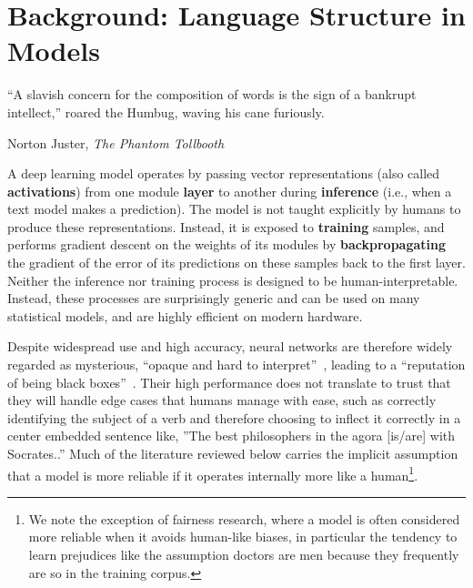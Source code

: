 \chapter{Background: Language Structure in Models}\label{chapter:linguistic}

\epigraph{``A slavish concern for the composition of words is the sign of a bankrupt intellect,'' roared the Humbug, waving his cane furiously.
}{Norton Juster, \textit{The Phantom Tollbooth}}





A deep learning model operates by passing vector representations (also called \textbf{activations}) from one module \textbf{layer} to another during \textbf{inference} (i.e., when a text model makes a prediction). The model is not taught explicitly by humans to  produce these representations. Instead, it is exposed to \textbf{training} samples, and performs gradient descent on the weights of its modules by \textbf{backpropagating} the gradient of the error of its predictions on these samples back to the first layer. Neither the inference nor training process is designed to be human-interpretable. Instead, these processes are surprisingly generic and can be used on many statistical models, and are highly efficient on modern hardware.

Despite widespread use and high accuracy, neural networks are therefore widely regarded as mysterious, ``opaque and hard to interpret''~\citep{elazar_amnesic_2020}, leading to a ``reputation of being black boxes''~\citep{alain_understanding_2018}. Their high performance does not translate to trust that they will handle edge cases that humans manage with ease, such as correctly identifying the subject of a verb and therefore choosing to inflect it correctly in a center embedded sentence like, ''The best philosophers in the agora [is/are] with Socrates..'' Much of the literature reviewed below carries the implicit assumption that a model is more reliable if it operates internally more like a human\footnote{We note the exception of fairness research, where a model is often considered more reliable when it avoids human-like biases, in particular the tendency to learn prejudices like the assumption doctors are men because they frequently are so in the training corpus.}.

